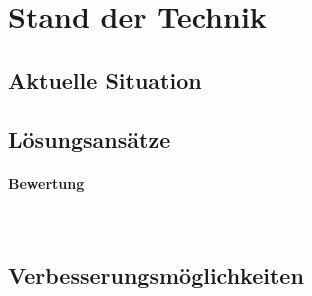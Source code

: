 
\section{Stand der Technik}
\label{Stand der Technik}

\subsection{Aktuelle Situation}
\label{Stand der Technik:Aktuelle Situation}


\subsection{Lösungsansätze}
\label{Stand der Technik:Lösungsansätze}


\paragraph{Bewertung}~\\


\subsection{Verbesserungsmöglichkeiten}
\label{Stand der Technik:Verbesserungsmöglichkeiten}

